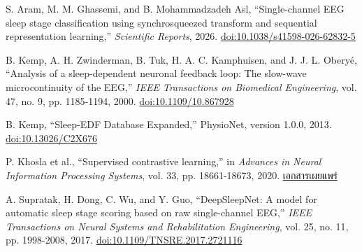 \documentclass[12pt,a4paper]{article}
\begin{document}
\begingroup
\fontsize{12.3}{14.5}\selectfont
\raggedright
\setlength{\parindent}{0pt}
\begin{enumerate}[label={[\arabic*]},leftmargin=1.15cm,itemsep=0.25\baselineskip,align=left]
  \item S. Aram, M. M. Ghassemi, and B. Mohammadzadeh Asl, ``Single-channel EEG sleep stage classification using synchrosqueezed transform and sequential representation learning,'' \textit{Scientific Reports}, 2026. \href{https://doi.org/10.1038/s41598-026-62832-5}{doi:10.1038/s41598-026-62832-5}
  \item B. Kemp, A. H. Zwinderman, B. Tuk, H. A. C. Kamphuisen, and J. J. L. Obery\'e, ``Analysis of a sleep-dependent neuronal feedback loop: The slow-wave microcontinuity of the EEG,'' \textit{IEEE Transactions on Biomedical Engineering}, vol. 47, no. 9, pp. 1185-1194, 2000. \href{https://doi.org/10.1109/10.867928}{doi:10.1109/10.867928}
  \item B. Kemp, ``Sleep-EDF Database Expanded,'' PhysioNet, version 1.0.0, 2013. \href{https://doi.org/10.13026/C2X676}{doi:10.13026/C2X676}
  \item P. Khosla et al., ``Supervised contrastive learning,'' in \textit{Advances in Neural Information Processing Systems}, vol. 33, pp. 18661-18673, 2020. \href{https://proceedings.neurips.cc/paper/2020/hash/d89a66c7c80a29b1bdbab0f2a1a94af8-Abstract.html}{เอกสารเผยแพร่}
  \item A. Supratak, H. Dong, C. Wu, and Y. Guo, ``DeepSleepNet: A model for automatic sleep stage scoring based on raw single-channel EEG,'' \textit{IEEE Transactions on Neural Systems and Rehabilitation Engineering}, vol. 25, no. 11, pp. 1998-2008, 2017. \href{https://doi.org/10.1109/TNSRE.2017.2721116}{doi:10.1109/TNSRE.2017.2721116}
\end{enumerate}
\endgroup
\end{document}
